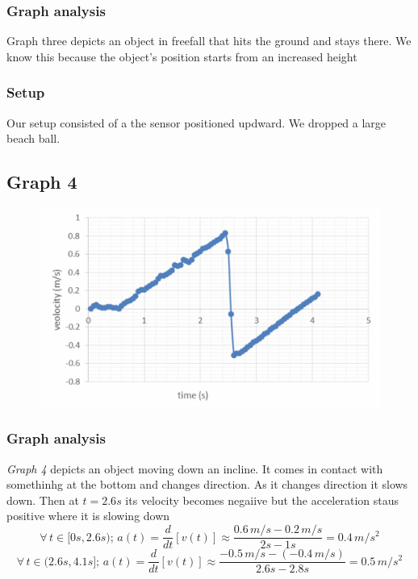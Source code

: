 \documentclass[11pt, letterpaper, includehead]{article}
\begin{document}
  \subsubsection{Graph analysis}
  Graph three depicts an object in freefall that hits the ground and stays there. We know this because the
  object's position starts from an increased height\\
  
  \subsubsection{Setup}
  Our setup consisted of a the sensor positioned updward. We dropped a large beach ball.\\

  \subsection{Graph 4}

  \begin{figure}[H] %
    \centering 
    \includegraphics[width=\linewidth]{graph_4.png}
  \end{figure}

  \subsubsection{Graph analysis}
  \emph{Graph 4} depicts an object moving down an incline. It comes in contact with somethinhg at the
  bottom and changes direction. As it changes direction it slows down. Then at $t=2.6s$ its velocity 
  becomes negaiive but the acceleration staus positive where it is slowing down\\
  $$\forall \, t \in [0s, 2.6s); \, a(t) = \frac{d}{dt}[v(t)] \approx \frac{0.6 \, m/s - 0.2 \, m/s}{2s - 1s} = 0.4 \, m/s^2$$
  $$\forall \, t \in (2.6s, 4.1s]; \, a(t) = \frac{d}{dt}[v(t)] \approx \frac{-0.5 \, m/s -(-0.4 \, m/s)}{2.6s - 2.8s} = 0.5 \, m/s^2$$ %
  
\end{document}
